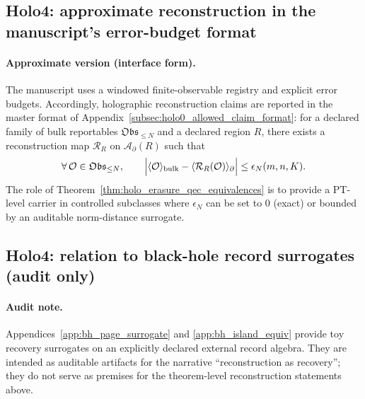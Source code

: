 \subsection{Holo4: approximate reconstruction in the manuscript's error-budget format}
\label{subsec:holo4_approximate_reconstruction_budget}

\paragraph{Approximate version (interface form).}
\InterfaceTag The manuscript uses a windowed finite-observable registry and explicit error budgets.
Accordingly, holographic reconstruction claims are reported in the master format
of Appendix~\ref{subsec:holo0_allowed_claim_format}:
for a declared family of bulk reportables $\mathfrak{Obs}_{\le N}$ and a declared region $R$,
there exists a reconstruction map $\mathcal{R}_R$ on $\mathcal{A}_{\partial}(R)$ such that
\[
\forall\,\mathcal{O}\in\mathfrak{Obs}_{\le N},\qquad
\Bigl|\langle \mathcal{O}\rangle_{\mathrm{bulk}}-\langle \mathcal{R}_R(\mathcal{O})\rangle_{\partial}\Bigr|
\le \epsilon_N(m,n,K).
\]
The role of Theorem~\ref{thm:holo_erasure_qec_equivalences} is to provide a PT-level carrier in controlled subclasses
where $\epsilon_N$ can be set to $0$ (exact) or bounded by an auditable norm-distance surrogate.

\subsection{Holo4: relation to black-hole record surrogates (audit only)}
\label{subsec:holo4_relation_to_bh_surrogates}

\paragraph{Audit note.}
\AuditTag Appendices~\ref{app:bh_page_surrogate} and \ref{app:bh_island_equiv} provide toy recovery surrogates
on an explicitly declared external record algebra.
They are intended as auditable artifacts for the narrative ``reconstruction as recovery'';
they do not serve as premises for the theorem-level reconstruction statements above.

